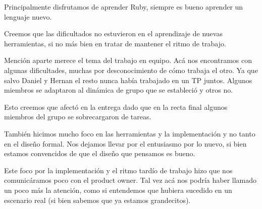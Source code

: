 Principalmente disfrutamos de aprender Ruby, siempre es bueno aprender un lenguaje nuevo.

Creemos que las dificultados no estuvieron en el aprendizaje de nuevas herramientas, si no más bien en tratar de mantener el ritmo de trabajo.

Mención aparte merece el tema del trabajo en equipo. Acá nos encontramos con algunas dificultades, muchas por desconocimiento de cómo trabaja el otro. Ya que salvo Daniel y Hernan el resto nunca había trabajado en un TP juntos. Algunos miembros se adaptaron al dinámica de grupo que se estableció y otros no. 

Esto creemos que afectó en la entrega dado que en la recta final algunos miembros del grupo se sobrecargaron de tareas.

También hicimos mucho foco en las herramientas y la implementación y no tanto en el diseño formal. Nos dejamos llevar por el entusiasmo por lo nuevo, si bien estamos convencidos de que el diseño que pensamos es bueno.

Este foco por la implementación y el ritmo tardío de trabajo hizo que nos comunicáramos poco con el product owner. Tal vez acá nos podría haber llamado un poco más la atención, como si entendemos que hubiera sucedido en un escenario real (si bien sabemos que ya estamos grandecitos).
